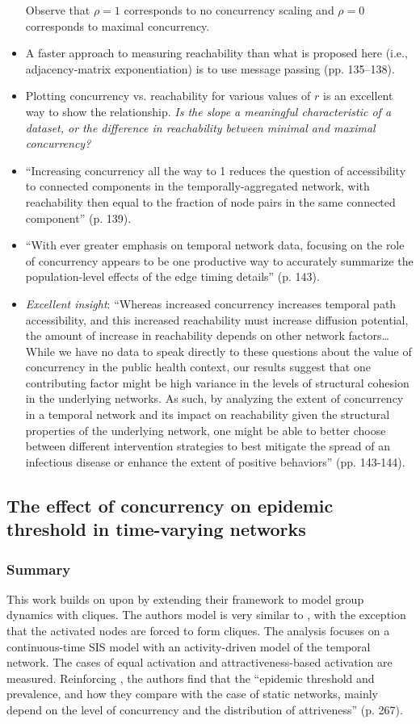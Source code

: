\begin{itemize}
Observe that $\rho = 1$ corresponds to no concurrency scaling and $\rho = 0$ corresponds to maximal concurrency.
\item A faster approach to measuring reachability than what is proposed here (i.e., adjacency-matrix exponentiation) is to use message passing (pp. 135--138).
\item Plotting concurrency vs. reachability for various values of $r$ is an excellent way to show the relationship. \emph{Is the slope a meaningful characteristic of a dataset, or the difference in reachability between minimal and maximal concurrency?}
\item ``Increasing concurrency all the way to 1 reduces the question of accessibility to connected components in the temporally-aggregated network, with reachability then equal to the fraction of node pairs in the same connected component'' (p. 139).
\item ``With ever greater emphasis on temporal network data, focusing on the role of concurrency appears to be one productive way to accurately summarize the population-level effects of the edge timing details'' (p. 143).
\item \emph{Excellent insight}: ``Whereas increased concurrency increases temporal path accessibility, and this increased reachability must increase diffusion potential, the amount of increase in reachability depends on other network factors{\ldots}While we have no data to speak directly to these questions about the value of concurrency in the public health context, our results suggest that one contributing factor might be high variance in the levels of structural cohesion in the underlying networks. As such, by analyzing the extent of concurrency in a temporal network and its impact on reachability given the structural properties of the underlying network, one might be able to better choose between different intervention strategies to best mitigate the spread of an infectious disease or enhance the extent of positive behaviors'' (pp. 143-144).
\end{itemize}

\subsection{The effect of concurrency on epidemic threshold in time-varying networks}
\subsubsection*{Summary}
This work builds on upon \cite{Onaga2017} by extending their framework to model group dynamics with cliques. The authors model is very similar to \cite{Onaga2017}, with the exception that the activated nodes are forced to form cliques. The analysis focuses on a continuous-time SIS model with an activity-driven model of the temporal network. The cases of equal activation and attractiveness-based activation are measured. Reinforcing \cite{Onaga2017}, the authors find that the ``epidemic threshold and prevalence, and how they compare with the case of static networks, mainly depend on the level of concurrency and the distribution of attriveness'' (p. 267).

